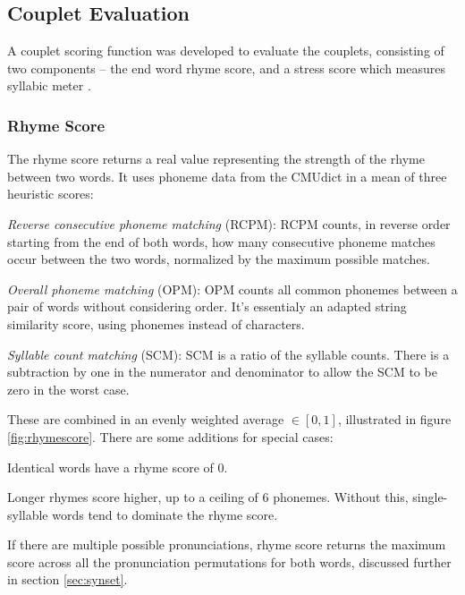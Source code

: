 \documentclass[11pt,a4paper]{article}
\newenvironment{tight_enumerate}{
\begin{enumerate}
\setlength{\itemsep}{0pt}
\setlength{\parskip}{0pt}
}{\end{enumerate}}
\newenvironment{tight_itemize}{
\begin{itemize}
\setlength{\itemsep}{0pt}
\setlength{\parskip}{0pt}
}{\end{itemize}}
\begin{document}
\subsection{Couplet Evaluation}
\label{sec:coupleteval}

A couplet scoring function was developed to evaluate the couplets, consisting of two components -- the end word rhyme score, and a stress score which measures syllabic meter \cite{meter_def}.

\subsubsection{Rhyme Score}
\label{sec:rhymescore}

The rhyme score returns a real value representing the strength of the rhyme between two words. It uses phoneme data from the CMUdict in a mean of three heuristic scores:
\begin{tight_itemize}
	\vspace{-0.5em}
	\item \textit{Reverse consecutive phoneme matching} (RCPM):
	RCPM counts, in reverse order starting from the end of both words, how many consecutive phoneme matches occur between the two words, normalized by the maximum possible matches.
	\item \textit{Overall phoneme matching} (OPM):
		OPM counts all common phonemes between a pair of words without considering order. It's essentialy an adapted \citet{ratcliff} string similarity score, using phonemes instead of characters.
	\item \textit{Syllable count matching} (SCM):
	SCM is a ratio of the syllable counts. There is a subtraction by one in the numerator and denominator to allow the SCM to be zero in the worst case.
\end{tight_itemize}

These are combined in an evenly weighted average $\in [0, 1]$, illustrated in figure \ref{fig:rhymescore}. There are some additions for special cases:
\begin{tight_enumerate}
	\vspace{-0.5em}
	\item
		Identical words have a rhyme score of 0.
	\item
		Longer rhymes score higher, up to a ceiling of 6 phonemes. Without this, single-syllable words tend to dominate the rhyme score.
	\item
		If there are multiple possible pronunciations, rhyme score returns the maximum score across all the pronunciation permutations for both words, discussed further in section \ref{sec:synset}.
\end{tight_enumerate}
\end{document}
